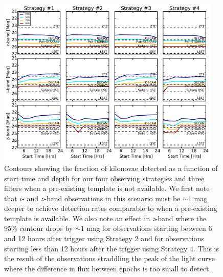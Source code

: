 \begin{figure}[t!]
\centering
\includegraphics[width=0.95\textwidth]{./figs/chapter2/ch2_f12.pdf}
\caption{Contours showing the fraction of kilonovae detected as a function of start time and depth for our four observing strategies and three filters when a pre-existing template is not available. We first note that $i$- and $z$-band observations in this scenario must be $\sim1$ mag deeper to achieve detection rates comparable to when a pre-existing template is available. We also note an effect in {\em z}-band where the 95\% contour drops by $\sim1$ mag for observations starting between 6 and 12 hours after trigger using Strategy 2 and for observations starting less than 12 hours after the trigger using Strategy 4. This is the result of the observations straddling the peak of the light curve where the difference in flux between epochs is too small to detect.}
\label{fig:ch2_detdiff}
\end{figure}


